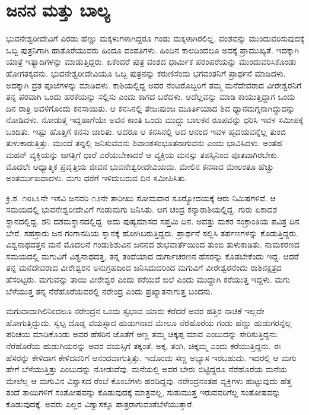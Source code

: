 
\chapter{ಜನನ ಮತ್ತು ಬಾಲ್ಯ}

ಭುವನೇಶ್ವರೀದೇವಿಗೆ ಎರಡು ಹೆಣ್ಣು ಮಕ್ಕಳುಗಳಾಗಿದ್ದರೂ ಗಂಡು ಮಕ್ಕಳಾಗಿರಲಿಲ್ಲ. ವಂಶವನ್ನು ಮುಂದುವರಿಸುವುದಕ್ಕೆ ಒಬ್ಬ ಪುತ್ರನಿಗಾಗಿ ಹಾತೊರೆಯುವರು ಹಿಂದೂ ದಂಪತಿಗಳು. ಹಿಂದಿನ ಕಾಲದಿಂದಲೂ ಅದಕ್ಕೆ ಪ್ರಾಮುಖ್ಯತೆ. ಇದಕ್ಕಾಗಿ ಯಾತ್ರೆ ಇತ್ಯಾದಿಗಳನ್ನು ಮಾಡುತ್ತಿದ್ದರು. ಏಕೆಂದರೆ ಪುತ್ರ ವಂಶದ ಧಾರ್ಮಿಕ ಪರಂಪರೆಯನ್ನು ಮುಂದುವರಿಸಿಕೊಂಡು ಹೋಗತಕ್ಕವನು. ಭುವನೇಶ್ವರೀದೇವಿಯೂ ಒಬ್ಬ ಪುತ್ರನನ್ನು ಕರುಣಿಸೆಂದು ಭಗವಂತನಿಗೆ ಪ್ರಾರ್ಥನೆ ಮಾಡಿದಳು. ಅದಕ್ಕಾಗಿ ವ್ರತ ಪೂಜೆಗಳನ್ನು ಮಾಡಿದಳು. ಕಾಶಿಯಲ್ಲಿದ್ದ ಅವರ ನೆಂಟರೊಬ್ಬರಿಗೆ ತಮ್ಮ ಮನೆದೇವರಾದ ವೀರೇಶ್ವರನಿಗೆ ತನ್ನ ಪರವಾಗಿ ಒಂದು ಹರಕೆಯನ್ನು ಸಲ್ಲಿಸು ಎಂದು ಕಾಗದ ಬರೆದಳು. ಅದೆಲ್ಲವನ್ನು ಮಾಡಿ ಕಾಯುತ್ತಿದ್ದಾಗ ಒಂದು ದಿನ ರಾತ್ರಿ ಅವಳಿಗೊಂದು ಕನಸಾಯಿತು. ಆ ಕನಸಿನಲ್ಲಿ ತೇಜಃಪುಂಜ ಮೂರ್ತಿಯಾದ ಶಿವ ಧ್ಯಾನಮಗ್ನನಾಗಿದ್ದುದನ್ನು ನೋಡಿದಳು. ನೋಡುತ್ತ ಇದ್ದಹಾಗೆಯೇ ಅವನ ಕಾಂತಿ ಒಂದು ಮುದ್ದು ಬಾಲಕನ ರೂಪವನ್ನು ಧರಿಸಿ ಇವಳ ಸಮೀಪಕ್ಕೆ ಬಂದಿತು. ಇಷ್ಟು ಹೊತ್ತಿಗೆ ಕನಸು ಜಾರಿತು. ಆದರೂ ಆ ಕನಸಿನಲ್ಲಿ ಆದ ಆನಂದ ಇವಳ ಹೃದಯವನ್ನೆಲ್ಲ ತುಂಬಿ ತುಳುಕಾಡುತ್ತಿತ್ತು. ಮುಂದೆ ತನ್ನಲ್ಲಿ ಜನಿಸುವವನು ಶಿವಾಂಶಸಂಭೂತನಾಗುವನು ಎಂದು ಭಾವಿಸಿದಳು. ಅಂತಹ ಮಹನ್ ‍ವ್ಯಕ್ತಿಯನ್ನು ಜಗತ್ತಿಗೆ ಧಾರೆ ಎರೆಯಬೇಕಾದರೆ ಆ ವ್ಯಕ್ತಿಯ ಮನಸ್ಸು ತಪಸ್ಸಿನಿಂದ ಪೂತವಾಗಿರಬೇಕು. ಮೊದಲೇ ಆಧ್ಯಾತ್ಮಿಕ ಪ್ರವೃತ್ತಿಯ ಜೀವನ ಭುವನೇಶ್ವರೀದೇವಿಯದು. ಮೇಲಿನ ಕನಸಾದ ಮೇಲಂತೂ ಹೆಚ್ಚು ಅಂತರ್ಮುಖವಾದಳು. ಮಗು ಧರೆಗೆ ಇಳಿದುಬರುವ ದಿನ ಸಮೀಪಿಸಿತು.

\newpage

ಕ್ರಿ.ಶ. ೧೮೬೩ನೇ ಇಸವಿ ಜನವರಿ ೧೨ನೇ ತಾರೀಖು ಸೋಮವಾರ ಸೂರ‍್ಯೋದಯಕ್ಕೆ ಆರು ನಿಮಿಷಗಳಿವೆ. ಆ ಸಮಯದಲ್ಲಿ ಭುವನೇಶ್ವರೀದೇವಿಗೆ ಗಂಡುಮಗು ಜನಿಸಿತು. ಆಗ ಚಂದ್ರ ಕನ್ಯಾರಾಶಿಯಲ್ಲಿದ್ದ. ಗುರು ಏಕಾದಶ ಸ್ಥಾನದಲ್ಲಿದ್ದ. ಶನಿ ದಶಮಸ್ಥಾನದಲ್ಲಿದ್ದ. ಅದು ಪುಷ್ಯಮಾಸದ ಸಪ್ತಮಿ ದಿನ. ಅವತ್ತು ಮಕರ ಸಂಕ್ರಾಂತಿಯ ಪವಿತ್ರ ದಿನ ಬೇರೆ. ಸಹಸ್ರಾರು ಜನ ಗಂಗಾನದಿಯ ಸ್ನಾನಕ್ಕೆ ಹೋಗಿಬರುತ್ತಿದ್ದರು, ಪ್ರಾರ್ಥನೆ ಸಲ್ಲಿಸಿ ತರ್ಪಣಗಳನ್ನು ಕೊಡುತ್ತಿದ್ದರು. ವಿಶ್ವನಾಥದತ್ತನ ಮನೆ ಮೊದಲನೆ ಗಂಡುಶಿಶುವಿನ ಜನನದ ಶುಭವಾರ್ತೆಯಿಂದ ತುಂಬಿ ತುಳುಕಾಡಿತು. ನಾಮಕರಣದ ಸಮಯದಲ್ಲಿ ಮಗುವಿಗೆ ವಿಶ್ವನಾಥದತ್ತ, ತನ್ನ ತಂದೆಯಾದ ದುರ್ಗಾಚರಣನ ಹೆಸರನ್ನು ಕೊಡಬೇಕೆಂದು ಇದ್ದ. ಆದರೆ ತನ್ನ ಮನೆದೇವರಾದ ವೀರೇಶ್ವರನ ಅನುಗ್ರಹದಿಂದ ಜನಿಸಿದುದರಿಂದ ಮಗುವಿಗೆ ವೀರೇಶ್ವರನೆಂದು ರಾಶಿನಕ್ಷತ್ರದ ಹೆಸರಿಟ್ಟರು. ಮಗುವನ್ನು ತಾಯಿ ವೀರೇಶ್ವರ ಎಂದು ಕರೆಯದೆ ಬಿಲೆ ಎಂದು ಮುದ್ದಾಗಿ ಕರೆಯುತ್ತ ಇದ್ದಳು. ಮಗು ಬೆಳೆಯುತ್ತ ತನ್ನ ನೆರೆಹೊರೆಯವರಲ್ಲಿ ನರೇಂದ್ರ ಎಂದು ಪ್ರಖ್ಯಾತನಾಗುತ್ತ ಬಂದನು.

ಮಗುವಾದಾಗಿಲಿನಿಂದಲೂ ನರೇಂದ್ರನ ಒಂದು ಸ್ವಭಾವ ಯಾರು ಕರೆದರೆ ಅವರ ಹತ್ತಿರ ನಾಚಿಕೆ ಇಲ್ಲದೇ ಹೋಗುತ್ತಿದ್ದುದು. ಸ್ವಲ್ಪ ದೊಡ್ಡ ವಯಸ್ಸಾದ ಹುಡುಗನಾದ ಮೇಲೂ ನೆರೆಹೊರೆಯ ಗಂಡು ಹೆಣ್ಣು ಹುಡುಗರನ್ನೆಲ್ಲ ಪರಿಚಯ ಮಾಡಿಕೊಂಡು ಅವರ ಹೆಸರಿನ ಜೊತೆಗೆ ಅಣ್ಣ ತಮ್ಮ ಚಿಕ್ಕಪ್ಪ ಮಾವ ಎಂಬುದನ್ನು ಸೇರಿಸುತ್ತಿದ್ದನು. ನೆರೆಹೊರೆಯ ಹುಡುಗಿಯರನ್ನು ಅವರ ವಯಸ್ಸಿಗೆ ತಕ್ಕಂತೆ, ಅಕ್ಕ, ತಂಗಿ, ಚಿಕ್ಕಮ್ಮ ಎಂದು ಕರೆಯುತ್ತಿದ್ದನು. ಈ ಹೆಸರನ್ನು ಕೇಳಿದಾಗ ಕೇಳಿದವರಿಗೆ ಆನಂದವಾಗುತ್ತಿತ್ತು. ಇದೊಂದು ಸಣ್ಣ ಅಭ್ಯಾಸ ಇರಬಹುದು. ಇದರಲ್ಲಿ ಆ ಮಗು ಹೇಗೆ ಬೆಳೆಯುತ್ತಿತ್ತು ಎಂಬುದನ್ನು ನೋಡುವೆವು. ಮನೆಯಲ್ಲಿ ಅವರ ಬೇರು ಬಿಟ್ಟಿದ್ದರೂ ನೆರೆಹೊರೆಯ ಮನೆಯ ಮೇಲೆಲ್ಲ ಆ ಮಗುವಿನ ವಿಶ್ವಾಸದ ರೆಂಬೆ ಕೊಂಬೆಗಳು ಹರಡಿದ್ದವು. ನರೇಂದ್ರನಂತಹ ವ್ಯಕ್ತಿಗಳು ಹುಟ್ಟುವುದು ಹೆತ್ತ ತಂದೆ ತಾಯಿಗಳಿಗೆ ಸಂತೋಷವನ್ನು ಕೊಡುವುದಕ್ಕೆ ಮಾತ್ರವಲ್ಲ, ಸುತುಮುತ್ತ ಇರುವವರಿಗೆಲ್ಲ ಸಂತೋಷವನ್ನು ಕೊಡುವುದಕ್ಕೆ. ಅವರು ಎಲ್ಲರ ವಿಶ್ವಾಸಕ್ಕೂ ಪಾತ್ರರಾಗುವಂತೆ\break ಬೆಳೆಯುತ್ತಾರೆ.

